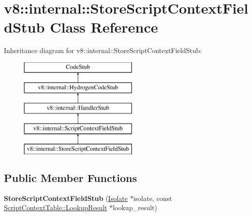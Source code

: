 \hypertarget{classv8_1_1internal_1_1_store_script_context_field_stub}{}\section{v8\+:\+:internal\+:\+:Store\+Script\+Context\+Field\+Stub Class Reference}
\label{classv8_1_1internal_1_1_store_script_context_field_stub}
Inheritance diagram for v8\+:\+:internal\+:\+:Store\+Script\+Context\+Field\+Stub\+:\begin{figure}[H]
\begin{center}
\leavevmode
\includegraphics[height=5.000000cm]{classv8_1_1internal_1_1_store_script_context_field_stub}
\end{center}
\end{figure}
\subsection*{Public Member Functions}
\begin{DoxyCompactItemize}
\item 
{\bfseries Store\+Script\+Context\+Field\+Stub} (\hyperlink{classv8_1_1internal_1_1_isolate}{Isolate} $\ast$isolate, const \hyperlink{structv8_1_1internal_1_1_script_context_table_1_1_lookup_result}{Script\+Context\+Table\+::\+Lookup\+Result} $\ast$lookup\+\_\+result)\hypertarget{classv8_1_1internal_1_1_store_script_context_field_stub_ac60b8af35e88d4b003ac6e7a4aa6a890}{}\label{classv8_1_1internal_1_1_store_script_context_field_stub_ac60b8af35e88d4b003ac6e7a4aa6a890}

\end{DoxyCompactItemize}
